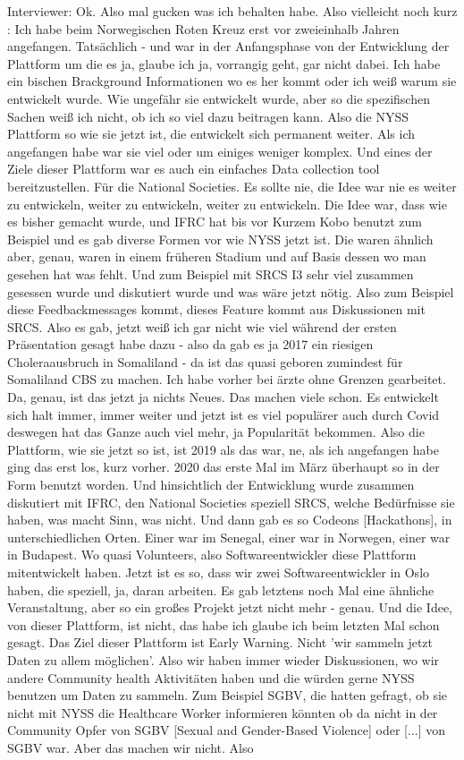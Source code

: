 Interviewer: Ok. Also mal gucken was ich behalten habe. Also vielleicht noch kurz : Ich habe beim Norwegischen Roten Kreuz erst vor zweieinhalb Jahren angefangen. Tats{\"a}chlich - und war in der Anfangsphase von der Entwicklung der Plattform um die es ja, glaube ich ja, vorrangig geht, gar nicht dabei. Ich habe ein bischen Brackground Informationen wo es her kommt oder ich weiß warum sie entwickelt wurde. Wie ungef{\"a}hr sie entwickelt wurde, aber so die spezifischen Sachen weiß ich nicht, ob ich so viel dazu beitragen kann. Also die NYSS Plattform so wie sie jetzt ist, die entwickelt sich permanent weiter. Als ich angefangen habe war sie viel oder um einiges weniger komplex. Und eines der Ziele dieser Plattform war es auch ein einfaches Data collection tool bereitzustellen. F{\"u}r die National Societies. Es sollte nie, die Idee war nie es weiter zu entwickeln, weiter zu entwickeln, weiter zu entwickeln. Die Idee war, dass wie es bisher gemacht wurde, und IFRC hat bis vor Kurzem Kobo benutzt zum Beispiel und es gab diverse Formen vor wie NYSS jetzt ist. Die waren {\"a}hnlich aber, genau, waren in einem fr{\"u}heren Stadium und auf Basis dessen wo man gesehen hat was fehlt. Und zum Beispiel mit SRCS I3 sehr viel zusammen gesessen wurde und diskutiert wurde und was w{\"a}re jetzt n{\"o}tig. Also zum Beispiel diese Feedbackmessages kommt, dieses Feature kommt aus Diskussionen mit SRCS. Also es gab, jetzt weiß ich gar nicht wie viel w{\"a}hrend der ersten Pr{\"a}sentation gesagt habe dazu - also da gab es ja 2017 ein riesigen Choleraausbruch in Somaliland - da ist das quasi geboren zumindest f{\"u}r Somaliland CBS zu machen. Ich habe vorher bei {\"a}rzte ohne Grenzen gearbeitet. Da, genau, ist das jetzt ja nichts Neues. Das machen viele schon. Es entwickelt sich halt immer, immer weiter und jetzt ist es viel popul{\"a}rer auch durch Covid deswegen hat das Ganze auch viel mehr, ja Popularit{\"a}t bekommen. Also die Plattform, wie sie jetzt so ist, ist 2019 als das war, ne, als ich angefangen habe ging das erst los, kurz vorher. 2020 das erste Mal im M{\"a}rz {\"u}berhaupt so in der Form benutzt worden. Und hinsichtlich der Entwicklung wurde zusammen diskutiert mit IFRC, den National Societies speziell SRCS, welche Bed{\"u}rfnisse sie haben, was macht Sinn, was nicht. Und dann gab es so Codeons [Hackathons], in unterschiedlichen Orten. Einer war im Senegal, einer war in Norwegen, einer war in Budapest. Wo quasi Volunteers, also Softwareentwickler diese Plattform mitentwickelt haben. Jetzt ist es so, dass wir zwei Softwareentwickler in Oslo haben, die speziell, ja, daran arbeiten. Es gab letztens noch Mal eine {\"a}hnliche Veranstaltung, aber so ein großes Projekt jetzt nicht mehr - genau. Und die Idee, von dieser Plattform, ist nicht, das habe ich glaube ich beim letzten Mal schon gesagt. Das Ziel dieser Plattform ist Early Warning. Nicht 'wir sammeln jetzt Daten zu allem m{\"o}glichen'. Also wir haben immer wieder Diskussionen, wo wir andere Community health Aktivit{\"a}ten haben und die w{\"u}rden gerne NYSS benutzen um Daten zu sammeln. Zum Beispiel SGBV, die hatten gefragt, ob sie nicht mit NYSS die Healthcare Worker informieren k{\"o}nnten ob da nicht in der Community Opfer von SGBV [Sexual and Gender-Based Violence] oder [...] von SGBV war. Aber das machen wir nicht. Also 